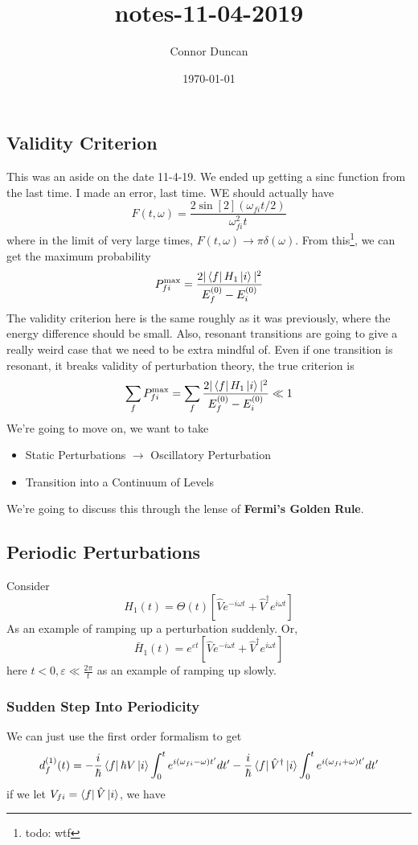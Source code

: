 \documentclass{article}
\author{Connor Duncan}
\date{\today}
\title{notes-11-04-2019}
\theoremstyle{definition}
\begin{document}
\subsection{Validity Criterion} This was an aside on the date 11-4-19. We ended up getting a sinc function from the last time. I made an error, last time. WE should actually have \begin{equation} F(t,\omega)=\frac{2\sin[2](\omega_{fi}t/2)}{\omega_{fi}^2t} \end{equation} where in the limit of very large times, $F(t,\omega)\rightarrow\pi\delta(\omega)$. From this\footnote{todo: wtf}, we can get the maximum probability \begin{equation} P_{fi}^{\mathrm{max}}=\frac{2|\bra{f}H_1\ket{i}|^2}{E_f^{(0)}-E_{i}^{(0)}} \end{equation} The validity criterion here is the same roughly as it was previously, where the energy difference should be small. Also, resonant transitions are going to give a really weird case that we need to be extra mindful of. Even if one transition is resonant, it breaks validity of perturbation theory, the true criterion is \begin{equation} \sum_{f}^{}P_{fi}^\mathrm{max}=\sum_{f}^{}\frac{2|\bra{f}H_1\ket{i}|^2}{E_{f}^{(0)}-E_{i}^{(0)}}\ll 1 \end{equation} We're going to move on, we want to take \begin{itemize} \item Static Perturbations $\rightarrow$ Oscillatory Perturbation \item Transition into a Continuum of Levels \end{itemize} We're going to discuss this through the lense of \textbf{Fermi's Golden Rule}. \subsection{Periodic Perturbations} Consider \begin{equation} H_1(t)=\Theta(t)\left[\hat Ve^{-i\omega t}+\hat V^\dag e^{i\omega t}\right] \end{equation} As an example of ramping up a perturbation suddenly. Or, \begin{equation} \bar H_1(t)=e^{\varepsilon t}\left[\hat Ve^{-i\omega t}+\hat V^\dag e^{i\omega t}\right] \end{equation} here $t<0,\varepsilon\ll\frac{2\pi}{t}$ as an example of ramping up slowly. \subsubsection{Sudden Step Into Periodicity} We can just use the first order formalism to get \begin{equation} d_f^{(1)}(t)=-\frac{i}{\hbar}\bra{f}\hbar V\ket{i}\int_{0}^{t}e^{i(\omega_{fi}-\omega)t'}dt' -\frac{i}{\hbar}\bra{f}\hat V^\dag\ket{i}\int_{0}^{t}e^{i(\omega_{fi}+\omega)t'}dt' \end{equation} if we let $V_{fi}=\bra{f}\hat V\ket{i}$, we have 
\end{document}
